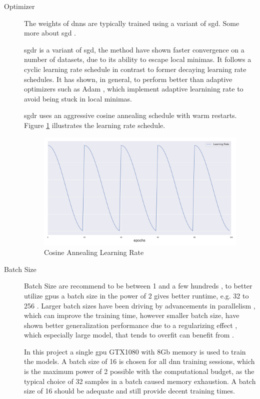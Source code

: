 \begin{description}
	\item[Optimizer] The weights of \gls{dnn}s are typically trained using a variant of \gls{sgd}. Some more about \gls{sgd} \cite{goodfellow_deep_2016}.
	
	\gls{sgdr} \cite{loshchilov_sgdr:_2016} is a variant of \gls{sgd}, the method have shown faster convergence on a number of datasets, due to its ability to escape local minimas. It follows a cyclic learning rate schedule in contrast to former decaying learning rate schedules. It has shown, in general, to perform better than adaptive optimizers such as Adam \cite{kingma_adam:_2014}, which implement adaptive learnining rate to avoid being stuck in local minimas. 
	
	\gls{sgdr} uses an aggressive cosine annealing schedule with warm restarts. Figure \ref{fig:cosineannealing} illustrates the learning rate schedule.
	
	\begin{figure}
		\centering
		\includegraphics[width=.7\linewidth]{figures/lr.png}
		\caption[Cosine Annealing Learning Rate]{Cosine Annealing Learning Rate} \label{fig:cosineannealing}
	\end{figure}

	\item[Batch Size] Batch Size are recommend to be between 1 and a few hundreds \cite{bengio_practical_2012}, to better utilize \gls{gpu}s a batch size in the power of 2 gives better runtime, e.g. 32 to 256 \cite{goodfellow_deep_2016}. Larger batch sizes have been driving by advancements in parallelism \cite{dean_large_2012}, which can improve the training time, however smaller batch size, have shown better generalization performance due to a regularizing effect \cite{masters_revisiting_nodate}, which especially large model, that tends to overfit can benefit from \cite{goodfellow_deep_2016}. 
	
	In this project a single \gls{gpu} GTX1080 with 8Gb memory is used to train the models. A batch size of 16 is chosen for all \gls{dnn} training sessions, which is the maximum power of 2 possible with the computational budget, as the typical choice of 32 samples in a batch caused memory exhaustion. A batch size of 16 should be adequate and still provide decent training times.
	

\end{description}
